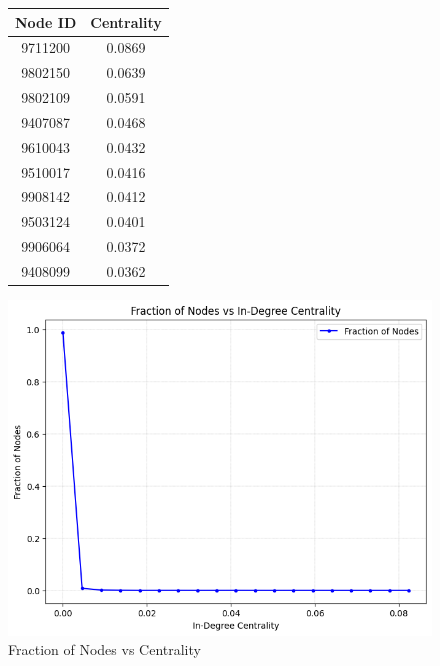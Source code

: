 \documentclass{article}
\begin{document}
\begin{figure}[h]
\centering
\begin{minipage}[b]{0.48\textwidth}
    \centering
    \begin{tabular}{|c|c|}
        \hline
        \textbf{Node ID} & \textbf{Centrality} \\
        \hline
        9711200 & 0.0869 \\
        9802150 & 0.0639 \\
        9802109 & 0.0591 \\
        9407087 & 0.0468 \\
        9610043 & 0.0432 \\
        9510017 & 0.0416 \\
        9908142 & 0.0412 \\
        9503124 & 0.0401 \\
        9906064 & 0.0372 \\
        9408099 & 0.0362 \\
        \hline
    \end{tabular}
    \label{tab:top_nodes_by_centrality}
\end{minipage}
\hfill
\begin{minipage}[b]{0.45\textwidth}
    \centering
    \includegraphics[width=\textwidth]{Figures/Fraction of Nodes Indegree Centrality.png}
    \caption{Fraction of Nodes vs Centrality}
    \label{fig:fraction_vs_centrality}
\end{minipage}
\end{figure}
\end{document}
